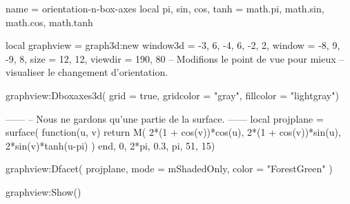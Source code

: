 \documentclass{standalone}
\begin{document}
\begin{luadraw}{name = orientation-n-box-axes}
local pi, sin, cos, tanh = math.pi, math.sin, math.cos, math.tanh

local graphview = graph3d:new{
  window3d = {-3, 6, -4, 6, -2, 2},
  window   = {-8, 9, -9, 8},
  size     = {12, 12},
  viewdir  = {190, 80}  -- Modifions le point de vue pour mieux
                        -- visualiser le changement d'orientation.
}

graphview:Dboxaxes3d({
  grid      = true,
  gridcolor = "gray",
  fillcolor = "lightgray"})

------
-- Nous ne gardons qu'une partie de la surface.
------
local projplane = surface(
  function(u, v)
    return M(
      2*(1 + cos(v))*cos(u),
      2*(1 + cos(v))*sin(u),
      2*sin(v)*tanh(u-pi)
    )
  end,
  0, 2*pi, 0.3, pi,
  {51, 15})

graphview:Dfacet(
  projplane,
  {
    mode  = mShadedOnly,
    color = "ForestGreen"
  })

graphview:Show()
\end{luadraw}
\end{document}
